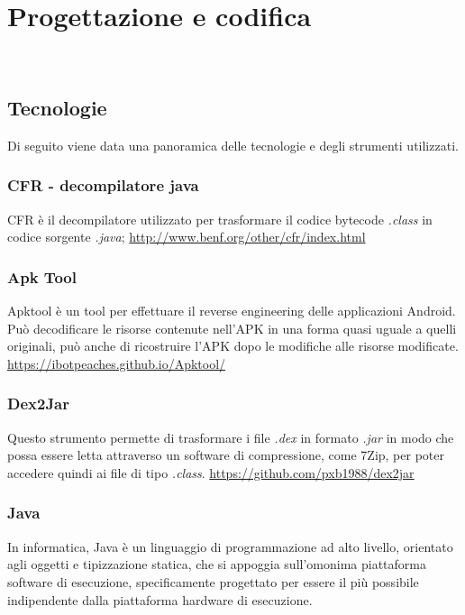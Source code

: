
\chapter{Progettazione e codifica}
\label{ch:progettazione-e-codifica}

\\

\section{Tecnologie}
\label{sec:tecnologie}

Di seguito viene data una panoramica delle tecnologie e degli strumenti utilizzati.

\subsection*{CFR - decompilatore java}
CFR è il decompilatore utilizzato per trasformare il codice bytecode \textit{.class} in codice sorgente \textit{.java};
\url{http://www.benf.org/other/cfr/index.html}

\subsection*{Apk Tool}
Apktool è un tool per effettuare il reverse engineering delle applicazioni Android. Può decodificare le risorse contenute nell'APK in una forma quasi uguale a quelli originali, può anche di ricostruire l'APK dopo le modifiche alle risorse modificate.
\url{https://ibotpeaches.github.io/Apktool/}
\subsection*{Dex2Jar}
Questo strumento permette di trasformare i file \textit{.dex} in formato \textit{.jar} in modo che possa essere letta attraverso un software di compressione, come 7Zip, per poter accedere quindi ai file di tipo \textit{.class}.
\url{https://github.com/pxb1988/dex2jar}


\subsection*{Java}
In informatica, Java è un linguaggio di programmazione ad alto livello, orientato agli oggetti e tipizzazione statica, che si appoggia sull'omonima piattaforma software di esecuzione, specificamente progettato per essere il più possibile indipendente dalla piattaforma hardware di esecuzione.
